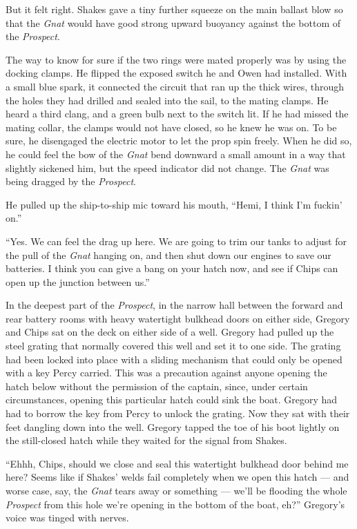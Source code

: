 \documentclass[
]{scrbook}
\begin{document}
But it felt right. Shakes gave a tiny further squeeze on the main
ballast blow so that the \emph{Gnat} would have good strong upward
buoyancy against the bottom of the \emph{Prospect}.

The way to know for sure if the two rings were mated properly was by
using the docking clamps. He flipped the exposed switch he and Owen had
installed. With a small blue spark, it connected the circuit that ran up
the thick wires, through the holes they had drilled and sealed into the
sail, to the mating clamps. He heard a third clang, and a green bulb
next to the switch lit. If he had missed the mating collar, the clamps
would not have closed, so he knew he was on. To be sure, he disengaged
the electric motor to let the prop spin freely. When he did so, he could
feel the bow of the \emph{Gnat} bend downward a small amount in a way
that slightly sickened him, but the speed indicator did not change. The
\emph{Gnat} was being dragged by the \emph{Prospect}.

He pulled up the ship-to-ship mic toward his mouth, ``Hemi, I think I'm
fuckin' on.''

``Yes. We can feel the drag up here. We are going to trim our tanks to
adjust for the pull of the \emph{Gnat} hanging on, and then shut down
our engines to save our batteries. I think you can give a bang on your
hatch now, and see if Chips can open up the junction between us.''

\bigskip

In the deepest part of the \emph{Prospect}, in the narrow hall between
the forward and rear battery rooms with heavy watertight bulkhead doors
on either side, Gregory and Chips sat on the deck on either side of a
well. Gregory had pulled up the steel grating that normally covered this
well and set it to one side. The grating had been locked into place with
a sliding mechanism that could only be opened with a key Percy carried.
This was a precaution against anyone opening the hatch below without the
permission of the captain, since, under certain circumstances, opening
this particular hatch could sink the boat. Gregory had had to borrow the
key from Percy to unlock the grating. Now they sat with their feet
dangling down into the well. Gregory tapped the toe of his boot lightly
on the still-closed hatch while they waited for the signal from Shakes.

``Ehhh, Chips, should we close and seal this watertight bulkhead door
behind me here? Seems like if Shakes' welds fail completely when we open
this hatch --- and worse case, say, the \emph{Gnat} tears away or
something --- we'll be flooding the whole \emph{Prospect} from this hole
we're opening in the bottom of the boat, eh?'' Gregory's voice was
tinged with nerves.
\end{document}
